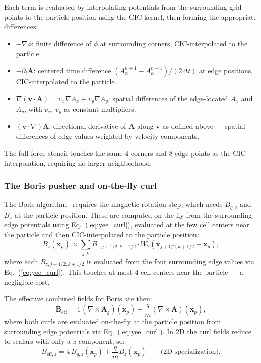 \documentclass[11pt,a4paper]{article}
\newcommand{\vv}[1]{\mathbf{#1}}
\newcommand{\Ag}{\vv{A}_g}
\begin{document}
Each term is evaluated by interpolating potentials from the surrounding grid points to the particle position using the CIC kernel, then forming the appropriate differences:
\begin{itemize}
  \item $-\nabla\phi$: finite difference of $\phi$ at surrounding corners, CIC-interpolated to the particle.
  \item $-\partial_t\vv{A}$: centered time difference $(A_\alpha^{n+1} - A_\alpha^{n-1})/(2\Delta t)$ at edge positions, CIC-interpolated to the particle.
  \item $\nabla(\vv{v}\cdot\vv{A}) = v_x\nabla A_x + v_y\nabla A_y$: spatial differences of the edge-located $A_x$ and $A_y$, with $v_x$, $v_y$ as constant multipliers.
  \item $(\vv{v}\cdot\nabla)\vv{A}$: directional derivative of $\vv{A}$ along $\vv{v}$ as defined above --- spatial differences of edge values weighted by velocity components.
\end{itemize}
The full force stencil touches the same $4$ corners and $8$ edge points as the CIC interpolation, requiring no larger neighborhood.

\subsubsection*{The Boris pusher and on-the-fly curl}

The Boris algorithm~\cite{Boris1970,BirdsallLangdon1991} requires the magnetic rotation step, which needs $B_{g,z}$ and $B_z$ at the particle position.  These are computed on the fly from the surrounding edge potentials using Eq.~(\ref{eq:yee_curl}), evaluated at the few cell centers near the particle and then CIC-interpolated to the particle position:
\begin{equation}
  B_{z}(\vv{x}_p) \approx \sum_{j,k} B_{z,j+1/2,k+1/2} \cdot W_2(\vv{x}_{j+1/2,k+1/2} - \vv{x}_p),
\end{equation}
where each $B_{z,j+1/2,k+1/2}$ is evaluated from the four surrounding edge values via Eq.~(\ref{eq:yee_curl}).  This touches at most 4 cell centers near the particle --- a negligible cost.

The effective combined fields for Boris are then:
\begin{equation}
  \vv{B}_{\mathrm{eff}} = 4\,(\nabla\times\Ag)(\vv{x}_p) + \frac{q}{m}(\nabla\times\vv{A})(\vv{x}_p),
\end{equation}
where both curls are evaluated on-the-fly at the particle position from surrounding edge potentials via Eq.~(\ref{eq:yee_curl}).  In 2D the curl fields reduce to scalars with only a $z$-component, so:
\begin{equation}
  B_{\mathrm{eff},z} = 4\,B_{g,z}(\vv{x}_p) + \frac{q}{m}B_z(\vv{x}_p) \qquad\text{(2D specialization).}
\end{equation}
\end{document}
